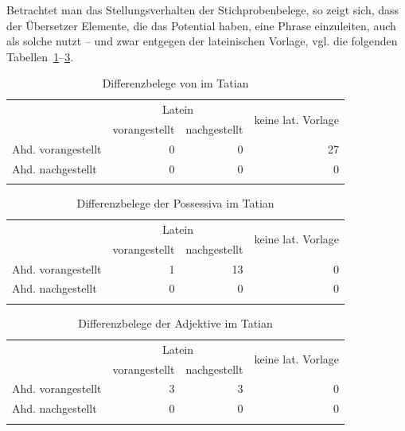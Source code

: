 Betrachtet man das Stellungsverhalten der Stichprobenbelege, so zeigt sich, dass der Übersetzer Elemente, die das Potential haben, eine Phrase einzuleiten, auch als solche nutzt -- und zwar entgegen der lateinischen Vorlage, vgl. die folgenden Tabellen~\ref{tab:diff-ther-tatian}--\ref{tab:diff-adj-tatian}.  

\begin{table}
\centering
\begin{tabular}{lrrr}
\lsptoprule
& \multicolumn{2}{c}{Latein} & \multirow{2}{*}{keine lat. Vorlage}\\
 \cmidrule(lr){2-3}
                   & vorangestellt & nachgestellt & \\ \midrule
Ahd. vorangestellt & 0                  & 0                 & 27                    \\
Ahd. nachgestellt  & 0                  & 0                 & 0                    \\ \lspbottomrule
\end{tabular}
\caption{Differenzbelege von  im Tatian}
\label{tab:diff-ther-tatian}
\end{table}

\begin{table}
\centering
\begin{tabular}{lrrr}
\lsptoprule
                   & \multicolumn{2}{c}{Latein} & \multirow{2}{*}{keine lat. Vorlage}\\
 \cmidrule(lr){2-3}
                   & vorangestellt & nachgestellt & \\ \midrule
Ahd. vorangestellt & 1                  & 13                 & 0                    \\
Ahd. nachgestellt  & 0                  & 0                 & 0                    \\ \lspbottomrule
\end{tabular}
\caption{Differenzbelege der Possessiva im Tatian}
\label{tab:diff-poss-tatian}
\end{table}

\begin{table}
\centering
\begin{tabular}{lrrr}
\lsptoprule
                   & \multicolumn{2}{c}{Latein} & \multirow{2}{*}{keine lat. Vorlage}\\
 \cmidrule(lr){2-3}
                   & vorangestellt & nachgestellt & \\ \midrule
Ahd. vorangestellt & 3                  & 3                & 0                    \\
Ahd. nachgestellt  & 0                  & 0                 & 0                    \\ \lspbottomrule
\end{tabular}
\caption{Differenzbelege der Adjektive im Tatian}
\label{tab:diff-adj-tatian}
\end{table}


